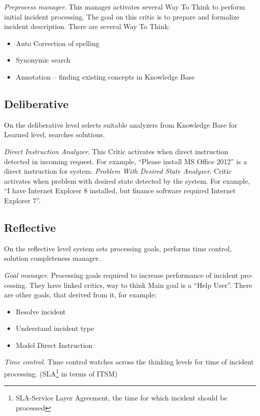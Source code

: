 \documentclass{llncs}
\begin{document}
\emph{Preprocess manager}. This manager activates several Way To Think to perform initial incident processing. The goal on this critic is to prepare and formalize incident description. There are several Way To Think:
\begin{itemize}
 \item Auto Correction of spelling
 \item Synonymic search
 \item Annotation – finding existing concepts in Knowledge Base
\end{itemize}

\subsection{Deliberative}

On the deliberative level selects suitable analyzers from Knowledge Base for Learned level, searches solutions.

\emph{Direct Instruction Analyzer}. This Critic activates when direct instruction detected in incoming request. For example, “Please install MS Office 2012” is a direct instruction for system.
\emph{Problem With Desired State Analyzer}. Critic activates when problem with desired state detected by the system. For example, “I have Internet Explorer 8 installed, but finance software required Internet Explorer 7”.

\subsection{Reflective}

On the reflective level system sets processing goals, performs time control, solution completeness manager.

\emph{Goal manager}. Processing goals required to increase performance of incident pro-cessing. They have linked critics, way to think Main goal is a “Help User”. There are other goals, that derived from it, for example:
\begin{itemize}
 \item Resolve incident
 \item Understand incident type
 \item Model Direct Instruction
\end{itemize}

\emph{Time control}. Time control watches across the thinking levels for time of incident processing. (SLA\footnote{SLA-Service Layer Agreement, the time for which incident should be processed} in terms of ITSM)
\end{document}

